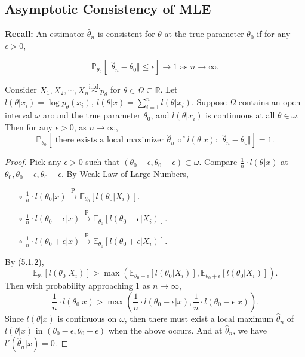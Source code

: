 \documentclass[a4paper]{article}
\begin{document}
\subsection{Asymptotic Consistency of MLE}
\textbf{Recall:} An estimator $\hat{\theta}_n$ is consistent for $\theta$ at the true parameter $\theta_0$ if for any $\epsilon > 0$,

\begin{equation}
	\mathbb{P}_{\theta_0}[\Vert \hat{\theta}_n - \theta_0 \Vert \leq \epsilon] \to 1 \text{ as } n \to \infty.
\end{equation}

\begin{thm}
	Consider $X_1,X_2,\cdots,X_n \stackrel{\text{i.i.d.}}{\sim} p_{\theta}$ for $\theta \in \Omega \subseteq \mathbb{R}$. Let $l(\theta|x_i) = \log p_{\theta} (x_i), \ l(\theta|x) = \sum\limits_{i=1}^n l(\theta|x_i)$. Suppose $\Omega$ contains an open interval $\omega$ around the true parameter $\theta_0$, and $l(\theta|x_i)$ is continuous at all $\theta \in \omega$.
	Then for any $\epsilon > 0$, as $n \to \infty$,
	\begin{equation}
		\mathbb{P}_{\theta_0}[\text{ there exists a local maximizer } \hat{\theta}_n \text{ of } l(\theta|x): \Vert \hat{\theta}_n - \theta_0 \Vert] = 1.
	\end{equation}
\end{thm}

\begin{proof}
	Pick any $\epsilon > 0$ such that $(\theta_0-\epsilon,\theta_0+\epsilon) \subset \omega$. Compare $\frac{1}{n} \cdot l(\theta|x)$ at $\theta_0,\theta_0-\epsilon,\theta_0+\epsilon$. By Weak Law of Large Numbers,
	\begin{itemize}
		\item[$\circ$] $\frac{1}{n} \cdot l(\theta_0|x) \stackrel{\text{P}}{\longrightarrow} \mathbb{E}_{\theta_0}[l(\theta_0|X_i)]$.
		\item[$\circ$] $\frac{1}{n} \cdot l(\theta_0-\epsilon|x) \stackrel{\text{P}}{\longrightarrow} \mathbb{E}_{\theta_0}[l(\theta_0-\epsilon|X_i)]$.
		\item[$\circ$] $\frac{1}{n} \cdot l(\theta_0+\epsilon|x) \stackrel{\text{P}}{\longrightarrow} \mathbb{E}_{\theta_0}[l(\theta_0+\epsilon|X_i)]$.
	\end{itemize}
	By (5.1.2),
	\begin{equation*}
		\mathbb{E}_{\theta_0}[l(\theta_0|X_i)] > \max (\mathbb{E}_{\theta_0 - \epsilon}[l(\theta_0|X_i)], \mathbb{E}_{\theta_0 + \epsilon}[l(\theta_0|X_i)]).
	\end{equation*}
	Then with probability approaching $1$ as $n \to \infty$,
	\begin{equation*}
		\frac{1}{n} \cdot l(\theta_0|x) > \max \left(\frac{1}{n} \cdot l(\theta_0-\epsilon|x),\frac{1}{n} \cdot l(\theta_0-\epsilon|x)\right).
	\end{equation*}
	Since $l(\theta|x)$ is continuous on $\omega$, then there must exist a local maximum $\hat{\theta}_n$ of $l(\theta|x)$ in $(\theta_0-\epsilon,\theta_0+\epsilon)$ when the above occurs. And at $\hat{\theta}_n$, we have $l'(\hat{\theta}_n|x) = 0$.
\end{proof}
\end{document}

